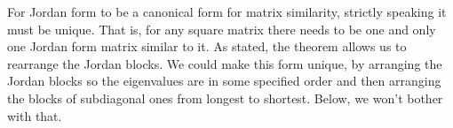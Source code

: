 


\begin{remark}
For Jordan form to be a canonical form for 
matrix similarity,
strictly speaking it must be unique.
That is, for any square matrix there needs to be one and only one 
Jordan form matrix
similar to it.
As stated, the theorem allows us to rearrange the Jordan blocks.
We could make this form unique, 
by arranging the Jordan blocks so the eigenvalues are in 
some specified order and then arranging
the blocks of subdiagonal ones from 
longest to shortest.
Below, we won't bother with that.
\end{remark}

